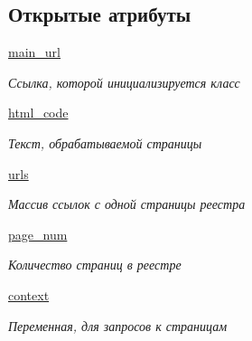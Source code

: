 \subsection*{Открытые атрибуты}
\begin{DoxyCompactItemize}
\item 
\mbox{\label{classUrlsReceiver_1_1UrlsReceiver_a26ea003c345156c0e7cdeb49750b15f2}} 
\hyperlink{classUrlsReceiver_1_1UrlsReceiver_a26ea003c345156c0e7cdeb49750b15f2}{main\+\_\+url}
\begin{DoxyCompactList}\small\item\em Ссылка, которой инициализируется класс \end{DoxyCompactList}\item 
\mbox{\label{classUrlsReceiver_1_1UrlsReceiver_a4a9800032de527abd7fbc8dfed704d53}} 
\hyperlink{classUrlsReceiver_1_1UrlsReceiver_a4a9800032de527abd7fbc8dfed704d53}{html\+\_\+code}
\begin{DoxyCompactList}\small\item\em Текст, обрабатываемой страницы \end{DoxyCompactList}\item 
\mbox{\label{classUrlsReceiver_1_1UrlsReceiver_aa118829b177026eba1f6701b7178fbfb}} 
\hyperlink{classUrlsReceiver_1_1UrlsReceiver_aa118829b177026eba1f6701b7178fbfb}{urls}
\begin{DoxyCompactList}\small\item\em Массив ссылок с одной страницы реестра \end{DoxyCompactList}\item 
\mbox{\label{classUrlsReceiver_1_1UrlsReceiver_af9f409bb62f37a08c7fc7eb37e07dd2a}} 
\hyperlink{classUrlsReceiver_1_1UrlsReceiver_af9f409bb62f37a08c7fc7eb37e07dd2a}{page\+\_\+num}
\begin{DoxyCompactList}\small\item\em Количество страниц в реестре \end{DoxyCompactList}\item 
\mbox{\label{classUrlsReceiver_1_1UrlsReceiver_ad10c955c9e74df17b8f5f9cc6a80a5e7}} 
\hyperlink{classUrlsReceiver_1_1UrlsReceiver_ad10c955c9e74df17b8f5f9cc6a80a5e7}{context}
\begin{DoxyCompactList}\small\item\em Переменная, для запросов к страницам \end{DoxyCompactList}\end{DoxyCompactItemize}


